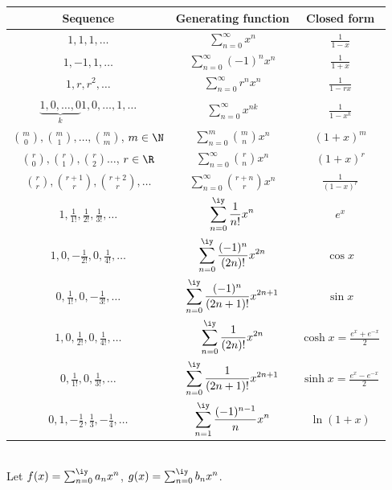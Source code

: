 \noindent \begin{tabular}{|c|c|c|}
\hline 
Sequence & Generating function & Closed form\tabularnewline
\hline 
$1,1,1,\ldots$ & $\displaystyle\sum_{n=0}^{\infty}x^{n}$ & $\displaystyle\frac{1}{1-x}$\tabularnewline
\hline 
$1,-1,1,\ldots$ & $\displaystyle\sum_{n=0}^{\infty}(-1)^{n}x^{n}$ & $\displaystyle\frac{1}{1+x}$\tabularnewline
\hline 
$1,r,r^{2},\ldots$ & $\displaystyle\sum_{n=0}^{\infty}r^{n}x^{n}$ & $\displaystyle\frac{1}{1-rx}$\tabularnewline
\hline 
$\displaystyle \underbrace{1,0,\ldots,0}_{k}1,0,\ldots,1,\ldots$ & $\displaystyle\sum_{n=0}^{\infty}x^{nk}$ & $\displaystyle\frac{1}{1-x^{k}}$\tabularnewline
\hline 
$\displaystyle \binom{m}{0},\binom{m}{1},\ldots,\binom{m}{m}$, $ m\in\N$ & $\displaystyle\sum_{n=0}^{m}\binom{m}{n}x^{n}$ & $\displaystyle (1+x)^{m}$\tabularnewline
\hline 
$\displaystyle\binom{r}{0},\binom{r}{1},\binom{r}{2}\ldots$, $\displaystyle r\in\R$ & $\displaystyle \sum_{n=0}^{\infty}\binom{r}{n}x^{n}$ & $\displaystyle (1+x)^{r}$\tabularnewline
\hline 
$\displaystyle \binom{r}{r},\binom{r+1}{r},\binom{r+2}{r},\ldots$ & $\displaystyle \sum_{n=0}^{\infty}\binom{r+n}{r}x^{n}$ & $\displaystyle \frac{1}{(1-x)^{r}}$\tabularnewline
\hline 
$\displaystyle 1,\frac{1}{1!},\frac{1}{2!},\frac{1}{3!},\ldots$ & $\displaystyle \sum_{n=0}^{\iy}\frac{1}{n!}x^{n}$ & $\displaystyle e^{x}$\tabularnewline
\hline 
$\displaystyle 1,0,-\frac{1}{2!},0,\frac{1}{4!},\ldots$ & $\displaystyle \sum_{n=0}^{\iy}\frac{(-1)^{n}}{(2n)!}x^{2n}$ & $\displaystyle \cos x$\tabularnewline
\hline 
$\displaystyle 0,\frac{1}{1!},0,-\frac{1}{3!},\ldots$ & $\displaystyle \sum_{n=0}^{\iy}\frac{(-1)^{n}}{(2n+1)!}x^{2n+1}$ & $\displaystyle \sin x$\tabularnewline
\hline 
$\displaystyle 1,0,\frac{1}{2!},0,\frac{1}{4!},\ldots$ & $\displaystyle \sum_{n=0}^{\iy}\frac{1}{(2n)!}x^{2n}$ & $\displaystyle \cosh x=\frac{e^{x}+e^{-x}}{2}$\tabularnewline
\hline 
$\displaystyle 0,\frac{1}{1!},0,\frac{1}{3!},\ldots$ & $\displaystyle \sum_{n=0}^{\iy}\frac{1}{(2n+1)!}x^{2n+1}$ & $\displaystyle \sinh x=\frac{e^{x}-e^{-x}}{2}$\tabularnewline
\hline 
$\displaystyle 0,1,-\frac{1}{2},\frac{1}{3},-\frac{1}{4},\ldots$ & $\displaystyle \sum_{n=1}^{\iy}\frac{(-1)^{n-1}}{n}x^n$ & $\displaystyle \ln(1+x)$\tabularnewline
\hline
\end{tabular}\\

Let $f(x)=\sum_{n=0}^{\iy} a_nx^n$, $g(x)=\sum_{n=0}^{\iy} b_nx^n$.

